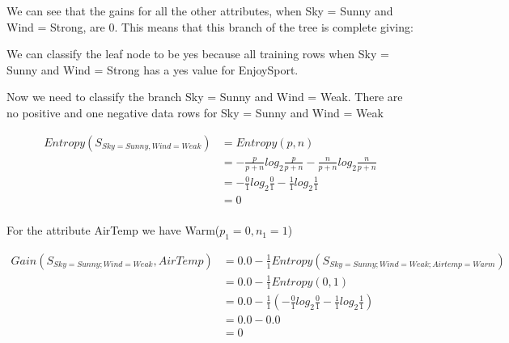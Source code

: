 \documentclass[10pt,a4paper]{article}
\begin{document}
{{{{{{{{{{We can see that the gains for all the other attributes, when Sky = Sunny and Wind = Strong, are 0. This means that this branch of the tree is complete giving:


We can classify the leaf node to be yes because all training rows when Sky = Sunny and Wind = Strong has a yes value for EnjoySport.

Now we need to classify the branch Sky = Sunny and Wind = Weak. There are no positive and one negative data rows for Sky = Sunny and Wind = Weak

\begin{equation}
\begin{split}
Entropy(S_{Sky=Sunny,Wind=Weak}) &= Entropy(p,n) \\
                       &= -\frac{p}{p+n}log_2\frac{p}{p+n} - \frac{n}{p+n}log_2\frac{n}{p+n}  \\
                       &= -\frac{0}{1} log_2\frac{0}{1} -\frac{1}{1} log_2\frac{1}{1} \\
                       &= 0   \\
\end{split}
\end{equation}

For the attribute AirTemp we have Warm($p_1=0,n_1=1$)
 
\begin{equation}
\begin{split}
Gain(S_{Sky=Sunny;Wind=Weak},AirTemp) &= 0.0 - \frac{1}{1} Entropy(S_{Sky=Sunny;Wind=Weak;Airtemp=Warm} )\\
          &= 0.0 - \frac{1}{1} Entropy(0,1) \\
          &= 0.0 - \frac{1}{1}( -\frac{0}{1} log_2\frac{0}{1} -\frac{1}{1} log_2\frac{1}{1} ) \\
          &= 0.0 - 0.0  \\
          &= 0
\end{split}
\end{equation}

}}}}}}}}}}
\end{document}
